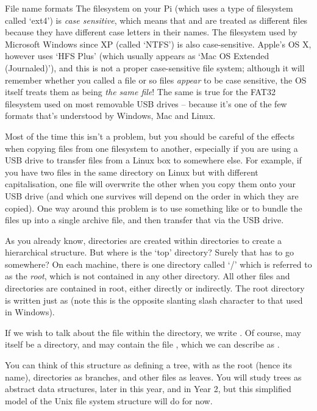 \begin{danger}{File name formats}
The filesystem on your Pi (which uses a type of filesystem called `ext4') is \textit{case sensitive}, which means that  and  are treated as different files because they have different case letters in their names. The filesystem used by Microsoft Windows since XP (called `NTFS') is also case-sensitive. Apple's OS X, however uses `HFS Plus' (which usually appears as `Mac OS Extended (Journaled)'), and this is not a proper case-sensitive file system; although it will remember whether you called a file  or  so files \textit{appear} to be case sensitive, the OS itself treats them as being \textit{the same file}! The same is true for the FAT32 filesystem used on most removable USB drives -- because it's one of the few formats that's understood by Windows, Mac and Linux. 

Most of the time this isn't a problem, but you should be careful of the effects when copying files from one filesystem to another, especially if you are using a USB drive to transfer files from a Linux box to somewhere else. For example, if you have two files in the same directory on Linux but with different capitalisation, one file will overwrite the other when you copy them onto your USB drive (and which one survives will depend on the order in which they are copied). One way around this problem is to use something like  or  to bundle the files up into a single archive file, and then transfer that via the USB drive. 
\end{danger}

As you already know, directories are created within directories to create a hierarchical structure. But where is the `top' directory? Surely that has to go somewhere? On each machine, there is one directory called `/' which is referred to as the \textit{root}, which is not contained in any other directory. All other files and directories are contained in root, either directly or indirectly. The root directory is written just as \fname{/} (note this is the opposite slanting slash character to that used in Windows). 

If we wish to talk about the file  within the directory,  we write . Of course,  may itself be a directory, and may contain the file , which we can describe as .

You can think of this structure as defining a tree, with \fname{/} as the root (hence its name), directories as branches, and other files as leaves. You will study trees as abstract data structures, later in this year, and in Year 2, but this simplified model of the Unix file system structure will do for now. 

